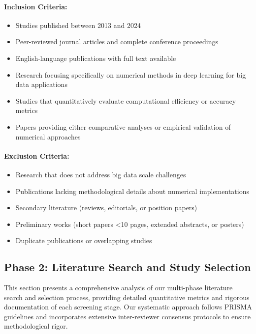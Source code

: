 \documentclass[acmsmall]{acmart}
\begin{document}
\noindent\paragraph{Inclusion Criteria:}
\begin{itemize}
    \item Studies published between 2013 and 2024
    \item Peer-reviewed journal articles and complete conference proceedings
    \item English-language publications with full text available
    \item Research focusing specifically on numerical methods in deep learning for big data applications
    \item Studies that quantitatively evaluate computational efficiency or accuracy metrics
    \item Papers providing either comparative analyses or empirical validation of numerical approaches
\end{itemize}

\noindent\paragraph{Exclusion Criteria:}
\begin{itemize}
    \item Research that does not address big data scale challenges
    \item Publications lacking methodological details about numerical implementations
    \item Secondary literature (reviews, editorials, or position papers)
    \item Preliminary works (short papers <10 pages, extended abstracts, or posters)
    \item Duplicate publications or overlapping studies
\end{itemize}


\subsection{Phase 2: Literature Search and Study Selection}\label{subsec:phase-2-literature-search-and-study-selection}

This section presents a comprehensive analysis of our multi-phase literature search and selection process, providing detailed quantitative metrics and rigorous documentation of each screening stage. Our systematic approach follows PRISMA guidelines \citep{moher2009preferred} and incorporates extensive inter-reviewer consensus protocols to ensure methodological rigor.
\end{document}
